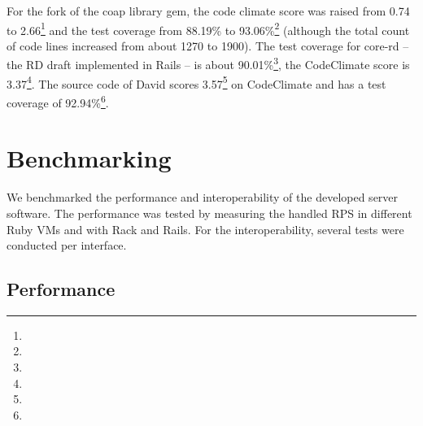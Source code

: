 	For the fork of the coap library gem, the code climate score was raised
	from 0.74 to 2.66\footnote{\urlClimateCoap} and the test coverage from
	88.19\% to 93.06\%\footnote{\urlCoverageCoap} (although the total count of
	code lines increased from about 1270 to 1900). The test coverage for
	core-rd -- the \ac{RD} draft \cite{rd} implemented in Rails -- is about
	90.01\%\footnote{\urlCoverageCoreRd}, the CodeClimate score is
	3.37\footnote{\urlClimateCoreRd}. The source code of David scores
	3.57\footnote{\urlClimateDavid} on CodeClimate and has a test coverage of
	92.94\%\footnote{\urlCoverageDavid}.

\section{Benchmarking}

	We benchmarked the performance and interoperability of the developed server
	software. The performance was tested by measuring the handled \acl{RPS} in
	different Ruby \acp{VM} and with Rack and \ac{Rails}. For the
	interoperability, several tests were conducted per interface.

	\subsection{Performance}
	\label{cha:evaluation:performance}

